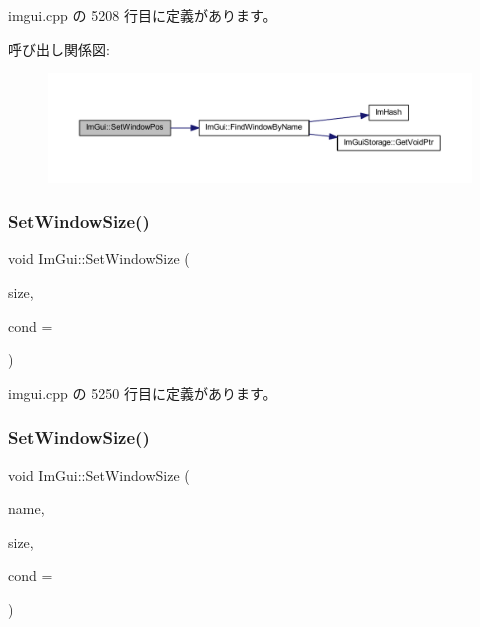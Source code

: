  imgui.\+cpp の 5208 行目に定義があります。

呼び出し関係図\+:\nopagebreak
\begin{figure}[H]
\begin{center}
\leavevmode
\includegraphics[width=350pt]{namespace_im_gui_a32032b56f975bb3145adbe19f38f3b56_cgraph}
\end{center}
\end{figure}
\mbox{\label{namespace_im_gui_a657c6cc2246485332f608a5204447ea1}} 
\subsubsection{\texorpdfstring{Set\+Window\+Size()}{SetWindowSize()}\hspace{0.1cm}{\footnotesize\ttfamily [1/2]}}
{\footnotesize\ttfamily void Im\+Gui\+::\+Set\+Window\+Size (\begin{DoxyParamCaption}\item[{const \mbox{\hyperlink{struct_im_vec2}{Im\+Vec2}} \&}]{size,  }\item[{\mbox{\hyperlink{imgui_8h_aef890d6ac872e12c5804d0b3e4f7f103}{Im\+Gui\+Cond}}}]{cond = {} }\end{DoxyParamCaption})}



 imgui.\+cpp の 5250 行目に定義があります。

\mbox{\label{namespace_im_gui_a441528b9198d4531e79337121212cd33}} 
\subsubsection{\texorpdfstring{Set\+Window\+Size()}{SetWindowSize()}\hspace{0.1cm}{\footnotesize\ttfamily [2/2]}}
{\footnotesize\ttfamily void Im\+Gui\+::\+Set\+Window\+Size (\begin{DoxyParamCaption}\item[{const char $\ast$}]{name,  }\item[{const \mbox{\hyperlink{struct_im_vec2}{Im\+Vec2}} \&}]{size,  }\item[{\mbox{\hyperlink{imgui_8h_aef890d6ac872e12c5804d0b3e4f7f103}{Im\+Gui\+Cond}}}]{cond = {} }\end{DoxyParamCaption})}



